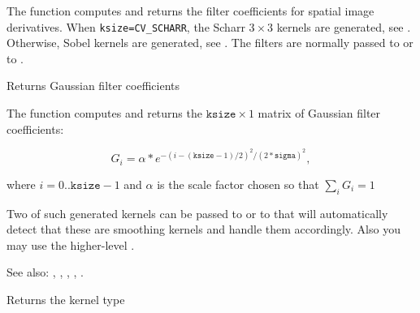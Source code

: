 The function computes and returns the filter coefficients for spatial image derivatives. When \texttt{ksize=CV\_SCHARR}, the Scharr $3 \times 3$ kernels are generated, see . Otherwise, Sobel kernels are generated, see . The filters are normally passed to  or to .

Returns Gaussian filter coefficients

\begin{description}
\end{description}

The function computes and returns the $\texttt{ksize} \times 1$ matrix of Gaussian filter coefficients:

\[G_i=\alpha*e^{-(i-(\texttt{ksize}-1)/2)^2/(2*\texttt{sigma})^2},\]
 
where $i=0..\texttt{ksize}-1$ and $\alpha$ is the scale factor chosen so that $\sum_i G_i=1$

Two of such generated kernels can be passed to  or to  that will automatically detect that these are smoothing kernels and handle them accordingly. Also you may use the higher-level .

See also: , , , , .

Returns the kernel type


\begin{description}
\end{description}

